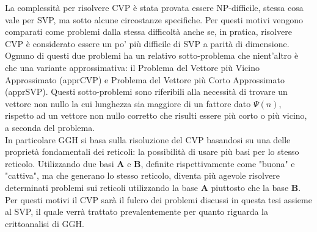 La complessità per risolvere CVP è stata provata essere NP-difficile\cite{CVP-NP09}, stessa
cosa vale per SVP, ma sotto alcune circostanze specifiche\cite{SVP-NP02}. Per questi motivi vengono
comparati come problemi dalla stessa difficoltà anche se, in pratica, risolvere CVP è considerato 
essere un po' più difficile di SVP a parità di dimensione.
Ognuno di questi due problemi ha un relativo sotto-problema che nient'altro è che una 
variante approssimativa: il Problema del Vettore più Vicino Approssimato (apprCVP) 
e Problema del Vettore più Corto Approssimato  (apprSVP). 
Questi sotto-problemi sono riferibili alla necessità di trovare un vettore non nullo la 
cui lunghezza sia maggiore di un fattore dato $\Psi(n)$, rispetto ad un vettore non nullo 
corretto che risulti essere più corto o più vicino, a seconda del problema.
\\
In particolare GGH si basa sulla risoluzione del CVP basandosi su una delle proprietà
fondamentali dei reticoli: la possibilità di usare più basi per lo stesso reticolo.
Utilizzando due basi $\mathbf{A}$ e $\mathbf{B}$, definite rispettivamente come 
"buona" e "cattiva", ma che generano lo stesso reticolo, diventa più agevole 
risolvere determinati problemi sui reticoli utilizzando la base $\mathbf{A}$ piuttosto 
che la base $\mathbf{B}$. 
Per questi motivi il CVP sarà il fulcro dei problemi discussi in questa tesi assieme al SVP,
il quale verrà trattato prevalentemente per quanto riguarda la crittoanalisi di GGH. 